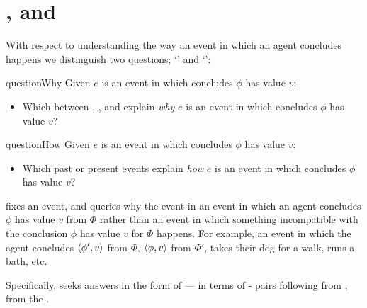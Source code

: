 \section*{\qWhy{}, \qHow{} and \issueInclusion{}}
\label{cha:intro:why-how}

\begin{note}
  With respect to understanding the way an event in which an agent concludes happens we distinguish two questions; `\qWhy{}' and `\qHow{}':

  \begin{question}{questionWhy}{\qWhy{}}
    Given \(e\) is an event in which \vAgent{} concludes \(\phi\) has value \(v\):
    \begin{itemize}
    \item
      Which \ros{} between , , and  explain \emph{why} \(e\) is an event in which \vAgent{} concludes \(\phi\) has value \(v\)?
    \end{itemize}
    \vspace{-1.5\baselineskip}
  \end{question}

  \begin{question}{questionHow}{\qHow{}}
    \label{q:how}
    Given \(e\) is an event in which \vAgent{} concludes \(\phi\) has value \(v\):
    \begin{itemize}
    \item
      Which past or present events explain \emph{how} \(e\) is an event in which \vAgent{} concludes \(\phi\) has value \(v\)?
    \end{itemize}
    \vspace{-1.5\baselineskip}
  \end{question}
\end{note}


\begin{note}
  \qWhy{} fixes an event, and queries why the event in an event in which an agent concludes \(\phi\) has value \(v\) from \(\Phi\) rather than an event in which something incompatible with the conclusion \(\phi\) has value \(v\) for \(\Phi\) happens.
  For example, an event in which the agent concludes \(\langle \phi', v \rangle\) from \(\Phi\), \(\langle \phi, v \rangle\) from \(\Phi'\), takes their dog for a walk, runs a bath, etc.

  Specifically, \qWhy{} seeks answers in the form of  --- in terms of - pairs following from \pool{}, from the \agpe{}.
\end{note}

